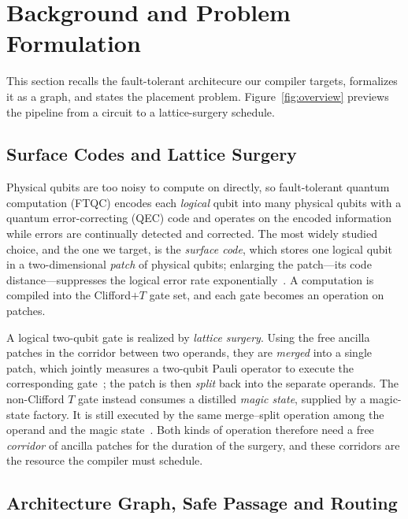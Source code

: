 \section{Background and Problem Formulation}
\label{sec:background}



This section recalls the fault-tolerant architecure our compiler targets, formalizes it as a graph, and states the placement problem.
Figure~\ref{fig:overview} previews the pipeline from a circuit to a lattice-surgery schedule.

\subsection{Surface Codes and Lattice Surgery}

Physical qubits are too noisy to compute on directly, so fault-tolerant quantum
computation (FTQC) encodes each \emph{logical} qubit into many physical qubits
with a quantum error-correcting (QEC) code and operates on the encoded
information while errors are continually detected and corrected. The most widely studied
choice, and the one we target, is the \emph{surface code}, which stores one
logical qubit in a two-dimensional \emph{patch} of physical qubits; enlarging the patch---its code
distance---suppresses the logical error rate
exponentially~\cite{fowler2012surface}. A computation is compiled into the Clifford$+T$ gate set, and each gate becomes an operation on patches.

A logical two-qubit gate is realized by \emph{lattice surgery}. Using the
free ancilla patches in the corridor between two operands, they are \emph{merged} 
into a single patch, which jointly measures
a two-qubit Pauli operator to execute the corresponding gate~\cite{horsman2012lattice,litinski2019game}; the patch is then \emph{split} back into the separate operands. 
The non-Clifford $T$ gate instead consumes a distilled \emph{magic state}, supplied by a magic-state factory. 
It is still executed by the same merge--split operation among 
the operand and the magic state~\cite{bravyi2005magic}.
Both kinds of operation therefore need a free \emph{corridor} of ancilla patches for the
duration of the surgery, and these corridors are the resource the compiler must schedule.

\subsection{Architecture Graph, Safe Passage and Routing}

